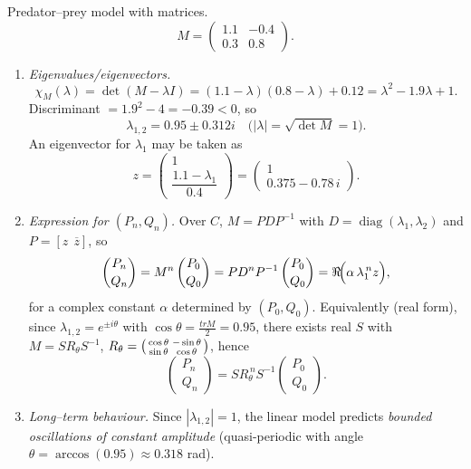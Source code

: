\documentclass[11pt]{article}
\def\textbf#1{#1}%
\def\mathbb#1{#1}%
\def\mathbf#1{#1}%
\def\mathrm#1{#1}%
\begin{document}
\begin{solution}
\textbf{Predator–prey model with matrices.}
\[
M=\begin{pmatrix}1.1&-0.4\\[2pt]0.3&0.8\end{pmatrix}.
\]
\begin{enumerate}
\item \emph{Eigenvalues/eigenvectors.}
\[
\chi_M(\lambda)=\det(M-\lambda I)
=(1.1-\lambda)(0.8-\lambda)+0.12
=\lambda^2-1.9\lambda+1.
\]
Discriminant $=1.9^2-4= -0.39<0$, so
\[
\lambda_{1,2}=0.95\pm 0.312\mathrm{i}
\quad\bigl(|\lambda|=\sqrt{\det M}=1\bigr).
\]
An eigenvector for $\lambda_1$ may be taken as
\[
\mathbf{z}=\begin{pmatrix}1\\[2pt]\dfrac{1.1-\lambda_1}{0.4}\end{pmatrix}
=\begin{pmatrix}1\\[2pt]0.375-0.78\,\mathrm{i}\end{pmatrix}.
\]

\item \emph{Expression for $(P_n,Q_n)$.} Over $\mathbb{C}$, $M=PD P^{-1}$ with
$D=\operatorname{diag}(\lambda_1,\lambda_2)$ and $P=[\mathbf{z}\ \ \overline{\mathbf{z}}]$,
so
\[
\begin{pmatrix}P_n\\[2pt]Q_n\end{pmatrix}
=M^n\begin{pmatrix}P_0\\[2pt]Q_0\end{pmatrix}
=P D^n P^{-1}\begin{pmatrix}P_0\\[2pt]Q_0\end{pmatrix}
=\Re\!\Bigl(\alpha\,\lambda_1^{\,n}\mathbf{z}\Bigr),
\]
for a complex constant $\alpha$ determined by $(P_0,Q_0)$.
Equivalently (real form), since $\lambda_{1,2}=e^{\pm i\theta}$ with $\cos\theta=\tfrac{\mathrm{tr}M}{2}=0.95$,
there exists real $S$ with $M=S R_\theta S^{-1}$, $R_\theta=\begin{psmallmatrix}\cos\theta&-\sin\theta\\ \sin\theta&\cos\theta\end{psmallmatrix}$,
hence
\[
\begin{pmatrix}P_n\\[2pt]Q_n\end{pmatrix}
=S R_\theta^{\,n} S^{-1}\begin{pmatrix}P_0\\[2pt]Q_0\end{pmatrix}.
\]

\item \emph{Long–term behaviour.} Since $|\lambda_{1,2}|=1$, the linear model predicts
\emph{bounded oscillations of constant amplitude} (quasi-periodic with angle $\theta=\arccos(0.95)\approx 0.318$ rad).
\end{enumerate}
\end{solution}
\end{document}
